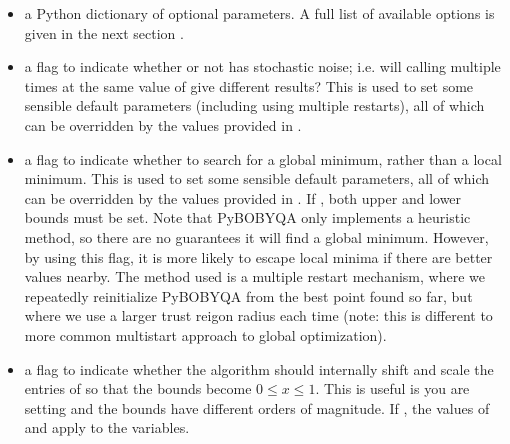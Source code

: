 \documentclass[letterpaper,10pt,english]{sphinxmanual}
\begin{document}
\begin{itemize}
\item {} 
 \sphinxhyphen{} a Python dictionary  of optional parameters. A full list of available options is given in the next section {\hyperref[\detokenize{advanced::doc}]{}}.

\item {} 
 \sphinxhyphen{} a flag to indicate whether or not  has stochastic noise; i.e. will calling  multiple times at the same value of  give different results? This is used to set some sensible default parameters (including using multiple restarts), all of which can be overridden by the values provided in .

\item {} 
 \sphinxhyphen{} a flag to indicate whether to search for a global minimum, rather than a local minimum. This is used to set some sensible default parameters, all of which can be overridden by the values provided in . If , both upper and lower bounds must be set. Note that Py\sphinxhyphen{}BOBYQA only implements a heuristic method, so there are no guarantees it will find a global minimum. However, by using this flag, it is more likely to escape local minima if there are better values nearby. The method used is a multiple restart mechanism, where we repeatedly re\sphinxhyphen{}initialize Py\sphinxhyphen{}BOBYQA from the best point found so far, but where we use a larger trust reigon radius each time (note: this is different to more common multi\sphinxhyphen{}start approach to global optimization).

\item {} 
 \sphinxhyphen{} a flag to indicate whether the algorithm should internally shift and scale the entries of  so that the bounds become \(0 \leq x \leq 1\). This is useful is you are setting  and the bounds have different orders of magnitude. If , the values of  and  apply to the  variables.


\end{itemize}
\end{document}
